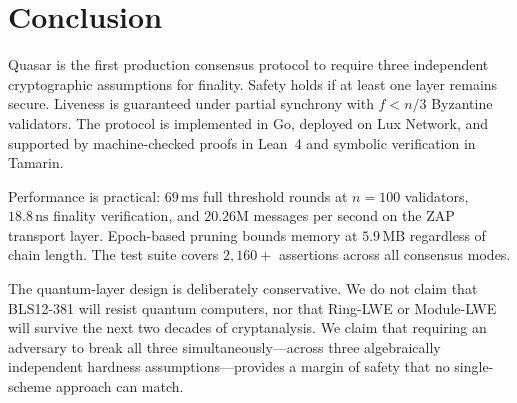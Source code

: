 \section{Conclusion}

\label{sec:conclusion}

Quasar is the first production consensus protocol to require three independent
cryptographic assumptions for finality. Safety holds if at least one layer
remains secure. Liveness is guaranteed under partial synchrony with $f < n/3$
Byzantine validators. The protocol is implemented in Go, deployed on Lux
Network, and supported by machine-checked proofs in Lean~4 and symbolic
verification in Tamarin.

Performance is practical: $69\,\text{ms}$ full threshold rounds at $n=100$
validators, $18.8\,\text{ns}$ finality verification, and $20.26$M messages
per second on the ZAP transport layer. Epoch-based pruning bounds memory at
$5.9\,\text{MB}$ regardless of chain length. The test suite covers $2{,}160+$
assertions across all consensus modes.

The quantum-layer design is deliberately conservative. We do not claim that
BLS12-381 will resist quantum computers, nor that Ring-LWE or Module-LWE will
survive the next two decades of cryptanalysis. We claim that requiring an
adversary to break all three simultaneously---across three algebraically
independent hardness assumptions---provides a margin of safety that no
single-scheme approach can match.


